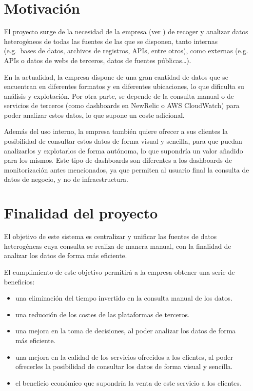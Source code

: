 \newpage{}
\section{Motivación}\label{sec:motivacion}
El proyecto surge de la necesidad de la empresa (ver ) de recoger y
analizar datos heterogéneos de todas las fuentes de las que se disponen, tanto internas
(e.g.~bases de datos, archivos de registros, APIs, entre otros), como externas
(e.g. APIs o datos de webs de terceros, datos de fuentes públicas\ldots).

En la actualidad, la empresa dispone de una gran cantidad de datos que se encuentran en
diferentes formatos y en diferentes ubicaciones, lo que dificulta su análisis y explotación.
Por otra parte, se depende de la consulta manual o de servicios de terceros (como dashboards
en NewRelic o AWS CloudWatch) para poder analizar estos datos, lo que supone un coste adicional.

Además del uso interno, la empresa también quiere ofrecer a sus clientes la posibilidad de
consultar estos datos de forma visual y sencilla, para que puedan analizarlos y explotarlos de
forma autónoma, lo que supondría un valor añadido para los mismos. Este tipo de dashboards
son diferentes a los dashboards de monitorización antes mencionados, ya que permiten al usuario
final la consulta de datos de negocio, y no de infraestructura.

\section{Finalidad del proyecto}\label{sec:finalidad}
El objetivo de este sistema es centralizar y unificar las fuentes de datos heterogéneas
cuya consulta se realiza de manera manual, con la finalidad de analizar los datos de forma
más eficiente.

El cumplimiento de este objetivo permitirá a la empresa obtener una serie de beneficios:
\begin{itemize}
	\item una eliminación del tiempo invertido en la consulta manual de los datos.
	\item una reducción de los costes de las plataformas de terceros.
	\item una mejora en la toma de decisiones, al poder analizar los datos de forma más eficiente.
	\item una mejora en la calidad de los servicios ofrecidos a los clientes, al poder ofrecerles
	      la posibilidad de consultar los datos de forma visual y sencilla.
	\item el beneficio económico que supondría la venta de este servicio a los clientes.
\end{itemize}

